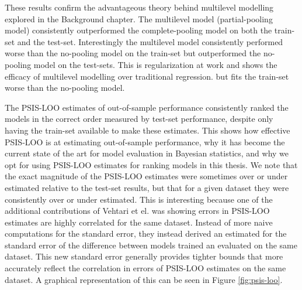 These results confirm the advantageous theory behind multilevel modelling explored in the Background chapter. The multilevel model (partial-pooling model) consistently outperformed the complete-pooling model on both the train-set and the test-set. Interestingly the multilevel model consistently performed worse than the no-pooling model on the train-set but outperformed the no-pooling model on the test-sets. This is regularization at work and shows the efficacy of multilevel modelling over traditional regression. but fits the train-set worse than the no-pooling model.

The PSIS-LOO estimates of out-of-sample performance consistently ranked the models in the correct order measured by test-set performance, despite only having the train-set available to make these estimates. This shows how effective PSIS-LOO is at estimating out-of-sample performance, why it has become the current state of the art for model evaluation in Bayesian statistics, and why we opt for using PSIS-LOO estimates for ranking models in this thesis. We note that the exact magnitude of the PSIS-LOO estimates were sometimes over or under estimated relative to the test-set results, but that for a given dataset they were consistently over or under estimated. This is interesting because one of the additional contributions of Vehtari et el. \cite{Vehtari2016} was showing errors in PSIS-LOO estimates are highly correlated for the same dataset. Instead of more naive computations for the standard error, they instead derived an estimated for the standard error of the difference between models trained an evaluated on the same dataset. This new standard error generally provides tighter bounds that more accurately reflect the correlation in errors of PSIS-LOO estimates on the same dataset. A graphical representation of this can be seen in Figure \ref{fig:psis-loo}.

